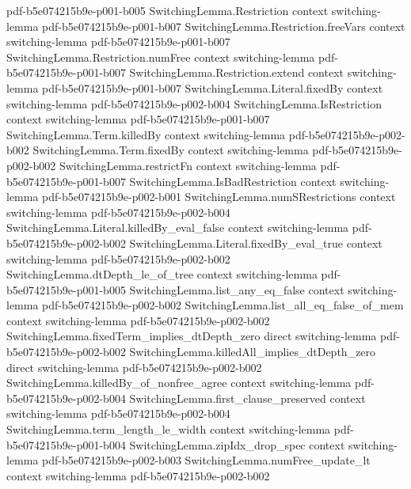 \begin{theorem}
  {pdf-b5e074215b9e-p001-b005}
\proofstep
  {SwitchingLemma.Restriction}
  {context}
  {switching-lemma}
  {pdf-b5e074215b9e-p001-b007}
\proofstep
  {SwitchingLemma.Restriction.freeVars}
  {context}
  {switching-lemma}
  {pdf-b5e074215b9e-p001-b007}
\proofstep
  {SwitchingLemma.Restriction.numFree}
  {context}
  {switching-lemma}
  {pdf-b5e074215b9e-p001-b007}
\proofstep
  {SwitchingLemma.Restriction.extend}
  {context}
  {switching-lemma}
  {pdf-b5e074215b9e-p001-b007}
\proofstep
  {SwitchingLemma.Literal.fixedBy}
  {context}
  {switching-lemma}
  {pdf-b5e074215b9e-p002-b004}
\proofstep
  {SwitchingLemma.IsRestriction}
  {context}
  {switching-lemma}
  {pdf-b5e074215b9e-p001-b007}
\proofstep
  {SwitchingLemma.Term.killedBy}
  {context}
  {switching-lemma}
  {pdf-b5e074215b9e-p002-b002}
\proofstep
  {SwitchingLemma.Term.fixedBy}
  {context}
  {switching-lemma}
  {pdf-b5e074215b9e-p002-b002}
\proofstep
  {SwitchingLemma.restrictFn}
  {context}
  {switching-lemma}
  {pdf-b5e074215b9e-p001-b007}
\proofstep
  {SwitchingLemma.IsBadRestriction}
  {context}
  {switching-lemma}
  {pdf-b5e074215b9e-p002-b001}
\proofstep
  {SwitchingLemma.numSRestrictions}
  {context}
  {switching-lemma}
  {pdf-b5e074215b9e-p002-b004}
\proofstep
  {SwitchingLemma.Literal.killedBy_eval_false}
  {context}
  {switching-lemma}
  {pdf-b5e074215b9e-p002-b002}
\proofstep
  {SwitchingLemma.Literal.fixedBy_eval_true}
  {context}
  {switching-lemma}
  {pdf-b5e074215b9e-p002-b002}
\proofstep
  {SwitchingLemma.dtDepth_le_of_tree}
  {context}
  {switching-lemma}
  {pdf-b5e074215b9e-p001-b005}
\proofstep
  {SwitchingLemma.list_any_eq_false}
  {context}
  {switching-lemma}
  {pdf-b5e074215b9e-p002-b002}
\proofstep
  {SwitchingLemma.list_all_eq_false_of_mem}
  {context}
  {switching-lemma}
  {pdf-b5e074215b9e-p002-b002}
\proofstep
  {SwitchingLemma.fixedTerm_implies_dtDepth_zero}
  {direct}
  {switching-lemma}
  {pdf-b5e074215b9e-p002-b002}
\proofstep
  {SwitchingLemma.killedAll_implies_dtDepth_zero}
  {direct}
  {switching-lemma}
  {pdf-b5e074215b9e-p002-b002}
\proofstep
  {SwitchingLemma.killedBy_of_nonfree_agree}
  {context}
  {switching-lemma}
  {pdf-b5e074215b9e-p002-b004}
\proofstep
  {SwitchingLemma.first_clause_preserved}
  {context}
  {switching-lemma}
  {pdf-b5e074215b9e-p002-b004}
\proofstep
  {SwitchingLemma.term_length_le_width}
  {context}
  {switching-lemma}
  {pdf-b5e074215b9e-p001-b004}
\proofstep
  {SwitchingLemma.zipIdx_drop_spec}
  {context}
  {switching-lemma}
  {pdf-b5e074215b9e-p002-b003}
\proofstep
  {SwitchingLemma.numFree_update_lt}
  {context}
  {switching-lemma}
  {pdf-b5e074215b9e-p002-b002}

\end{theorem}
